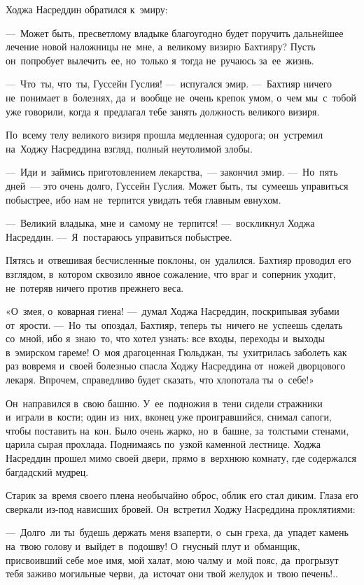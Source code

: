 \documentclass[12pt,a4paper]{book}
\begin{document}
Ходжа Насреддин обратился к~эмиру:

—~Может быть, пресветлому владыке благоугодно будет поручить дальнейшее лечение новой наложницы не~мне, а~великому визирю Бахтияру? Пусть он~попробует вылечить~ее, но~только я~тогда не~ручаюсь за~ее~жизнь.

—~Что~ты, что~ты, Гуссейн Гуслия! —~испугался эмир. —~Бахтияр ничего не~понимает в~болезнях, да~и~вообще не~очень крепок умом, о~чем мы~с~тобой уже говорили, когда я~предлагал тебе занять должность великого визиря.

По~всему телу великого визиря прошла медленная судорога; он~устремил на~Ходжу Насреддина взгляд, полный неутолимой злобы.

—~Иди и~займись приготовлением лекарства,~— закончил эмир. —~Но~пять дней~— это очень долго, Гуссейн Гуслия. Может быть, ты~сумеешь управиться побыстрее, ибо нам не~терпится увидать тебя главным евнухом.

—~Великий владыка, мне и~самому не~терпится! —~воскликнул Ходжа Насреддин. —~Я~постараюсь управиться побыстрее.

Пятясь и~отвешивая бесчисленные поклоны, он~удалился. Бахтияр проводил его взглядом, в~котором сквозило явное сожаление, что враг и~соперник уходит, не~потеряв ничего против прежнего веса.

«О~змея, о~коварная гиена! —~думал Ходжа Насреддин, поскрипывая зубами от~ярости. —~Но~ты~опоздал, Бахтияр, теперь ты~ничего не~успеешь сделать со~мной, ибо я~знаю~то, что хотел узнать: все входы, переходы и~выходы в~эмирском гареме! О~моя драгоценная Гюльджан, ты~ухитрилась заболеть как раз вовремя и~своей болезнью спасла Ходжу Насреддина от~ножей дворцового лекаря. Впрочем, справедливо будет сказать, что хлопотала ты~о~себе!»

Он~направился в~свою башню. У~ее~подножия в~тени сидели стражники и~играли в~кости; один из~них, вконец уже проигравшийся, снимал сапоги, чтобы поставить на~кон. Было очень жарко, но~в~башне, за~толстыми стенами, царила сырая прохлада. Поднимаясь по~узкой каменной лестнице. Ходжа Насреддин прошел мимо своей двери, прямо в~верхнюю комнату, где содержался багдадский мудрец.

Старик за~время своего плена необычайно оброс, облик его стал диким. Глаза его сверкали из-под нависших бровей. Он~встретил Ходжу Насреддина проклятиями:

—~Долго~ли ты~будешь держать меня взаперти, о~сын греха, да~упадет камень на~твою голову и~выйдет в~подошву! О~гнусный плут и~обманщик, присвоивший себе мое имя, мой халат, мою чалму и~мой пояс, да~прогрызут тебя заживо могильные черви, да~источат они твой желудок и~твою печень!..
\end{document}
